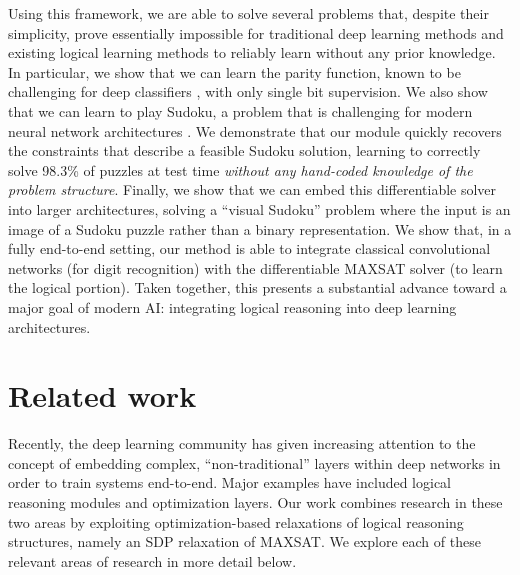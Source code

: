 \documentclass{article}
\begin{document}
	Using this framework, we are able to solve several problems that, despite their simplicity, prove essentially impossible for traditional deep learning methods and existing logical learning methods to reliably learn without any prior knowledge.  
	In particular, we show that we can learn the parity function, known to be challenging for deep classifiers \cite{shalev2017failures}, with only single bit supervision.  
	We also show that we can learn to play  Sudoku, a problem that is challenging for modern neural network architectures \cite{palm2017recurrent}. 
	We demonstrate that our module quickly recovers the constraints that describe a feasible Sudoku solution, learning to correctly solve 98.3\% of puzzles at test time \emph{without any hand-coded knowledge of the problem structure}.
Finally, we show that we can embed this differentiable solver into larger architectures, solving a ``visual Sudoku'' problem where the input is an image of a Sudoku puzzle rather than a binary representation. We show that, in a fully end-to-end setting, our method is able to integrate classical convolutional networks (for digit recognition) with the differentiable MAXSAT solver (to learn the logical portion).  
	Taken together, this presents a substantial advance toward a major goal of modern AI: integrating logical reasoning into deep learning architectures.
	
	
	\section{Related work}
	
	Recently, the deep learning community has given increasing attention to the concept of embedding complex, ``non-traditional'' layers within deep networks in order to train systems end-to-end.
	Major examples have included logical reasoning modules and optimization layers. 
	Our work combines research in these two areas by exploiting optimization-based relaxations of logical reasoning structures, namely an SDP relaxation of MAXSAT.
	We explore each of these relevant areas of research in more detail below.
	
\end{document}
